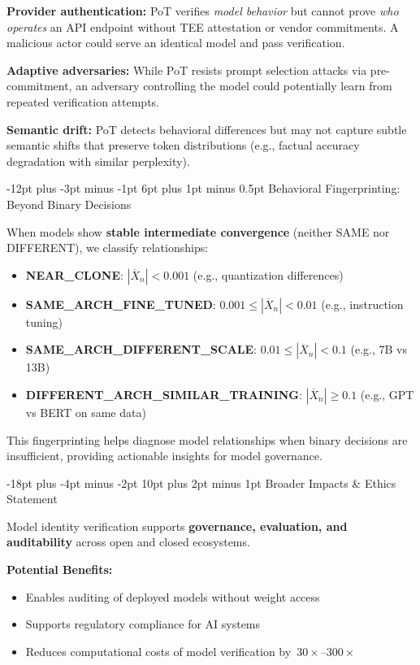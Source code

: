 \documentclass[11pt]{article}
\makeatletter
\renewcommand\section{\@startsection{section}{1}{\z@}%
  {-18pt plus -4pt minus -2pt}%
  {10pt plus 2pt minus 1pt}%
  {\normalfont\Large\bfseries}}
\renewcommand\subsection{\@startsection{subsection}{2}{\z@}%
  {-12pt plus -3pt minus -1pt}%
  {6pt plus 1pt minus 0.5pt}%
  {\normalfont\large\bfseries}}
\makeatother
\begin{document}
\textbf{Provider authentication:} PoT verifies \emph{model behavior} but cannot prove \emph{who operates} an API endpoint without TEE attestation or vendor commitments. A malicious actor could serve an identical model and pass verification.

\textbf{Adaptive adversaries:} While PoT resists prompt selection attacks via pre-commitment, an adversary controlling the model could potentially learn from repeated verification attempts.

\textbf{Semantic drift:} PoT detects behavioral differences but may not capture subtle semantic shifts that preserve token distributions (e.g., factual accuracy degradation with similar perplexity).

\subsection{Behavioral Fingerprinting: Beyond Binary Decisions}
\label{sec:behavioral-fingerprinting}

When models show \textbf{stable intermediate convergence} (neither SAME nor DIFFERENT), we classify relationships:
\begin{itemize}
\item \textbf{NEAR\_CLONE}: $|\overline{X}_n| < 0.001$ (e.g., quantization differences)
\item \textbf{SAME\_ARCH\_FINE\_TUNED}: $0.001 \leq |\overline{X}_n| < 0.01$ (e.g., instruction tuning)
\item \textbf{SAME\_ARCH\_DIFFERENT\_SCALE}: $0.01 \leq |\overline{X}_n| < 0.1$ (e.g., 7B vs 13B)
\item \textbf{DIFFERENT\_ARCH\_SIMILAR\_TRAINING}: $|\overline{X}_n| \geq 0.1$ (e.g., GPT vs BERT on same data)
\end{itemize}

This fingerprinting helps diagnose model relationships when binary decisions are insufficient, providing actionable insights for model governance.

\section{Broader Impacts \& Ethics Statement}

Model identity verification supports \textbf{governance, evaluation, and auditability} across open and closed ecosystems.

\textbf{Potential Benefits:}
\begin{itemize}
\item Enables auditing of deployed models without weight access
\item Supports regulatory compliance for AI systems
\item Reduces computational costs of model verification by~$30{\times}$--$300{\times}$
\end{itemize}
\end{document}
